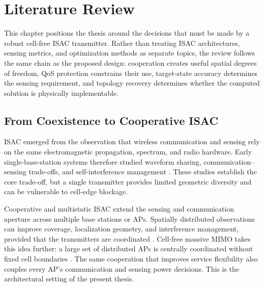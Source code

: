 \chapter{Literature Review}\label{ch:literature_review}

This chapter positions the thesis around the decisions that must be made by a
robust cell-free ISAC transmitter. Rather than treating ISAC architectures,
sensing metrics, and optimization methods as separate topics, the review
follows the same chain as the proposed design: cooperation creates useful
spatial degrees of freedom, QoS protection constrains their use, target-state
accuracy determines the sensing requirement, and topology recovery determines
whether the computed solution is physically implementable.

\section{From Coexistence to Cooperative ISAC}

ISAC emerged from the observation that wireless communication and sensing rely
on the same electromagnetic propagation, spectrum, and radio hardware. Early
single-base-station systems therefore studied waveform sharing, communication--
sensing trade-offs, and self-interference management
\autocite{liuSurveyFundamentalLimits2022,huaOptimalTransmitBeamforming2023,heIntegratedSensingFullduplex2023}.
\autocite{liuIntegratedSensingCommunications2022,liuJointRadarCommunication2020}
These studies establish the core trade-off, but a single transmitter provides
limited geometric diversity and can be vulnerable to cell-edge blockage.

Cooperative and multistatic ISAC extend the sensing and communication aperture
across multiple base stations or APs. Spatially distributed observations can
improve coverage, localization geometry, and interference management, provided
that the transmitters are coordinated
\autocite{cuiReviewMultibaseStation2025,mengCooperativeISACNetworks2025,liaoCooperativeBaseStation2025}.
\autocite{chengNetworkedBeamforming2024,maoCommunicationSensingRegion2024,liNetworkedISAC2024}
Cell-free massive MIMO takes this idea further: a large set of distributed APs
is centrally coordinated without fixed cell boundaries
\autocite{femeniasScalableCellfreeMassive2025,demirhanCellfreeISACMIMO2025}.
\autocite{maoCommunicationSensingRegion2024,renSecureCellfreeISAC2024}
The same cooperation that improves service flexibility also couples every
AP's communication and sensing power decisions. This is the architectural
setting of the present thesis.

